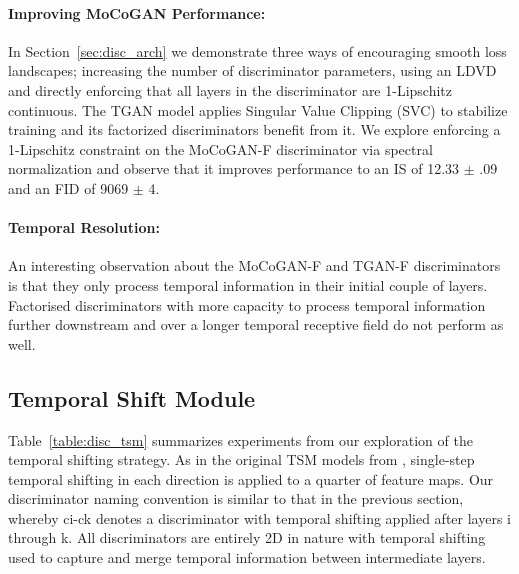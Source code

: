 \documentclass[a4paper,fleqn]{cas-sc}
\begin{document}
\paragraph{Improving MoCoGAN Performance:} In Section~\ref{sec:disc_arch} we demonstrate three ways of encouraging smooth loss landscapes; increasing the number of discriminator parameters, using an LDVD and directly enforcing that all layers in the discriminator are 1-Lipschitz continuous.  The TGAN model applies Singular Value Clipping (SVC) to stabilize training and its factorized discriminators benefit from it. We explore enforcing a 1-Lipschitz constraint on the MoCoGAN-F discriminator via spectral normalization \cite{MiyatoKKY18spectral} and observe that it improves performance to an IS of 12.33 $\pm$ .09 and an FID of 9069 $\pm$ 4. 

\paragraph{Temporal Resolution:} An interesting observation about the MoCoGAN-F and TGAN-F discriminators is that they only process temporal information in their initial couple of layers. Factorised discriminators with more capacity to process temporal information further downstream and over a longer temporal receptive field do not perform as well. 

\subsection{Temporal Shift Module}
Table~\ref{table:disc_tsm} summarizes experiments from our exploration of the temporal shifting strategy. As in the original TSM models from \citet{linGHtsm}, single-step temporal shifting in each direction is applied  to a quarter of feature maps. Our discriminator naming convention is similar to that in the previous section, whereby ci-ck denotes a discriminator with temporal shifting applied after layers i through k. All discriminators are entirely 2D in nature with temporal shifting used to capture and merge temporal information between intermediate layers.
\end{document}
